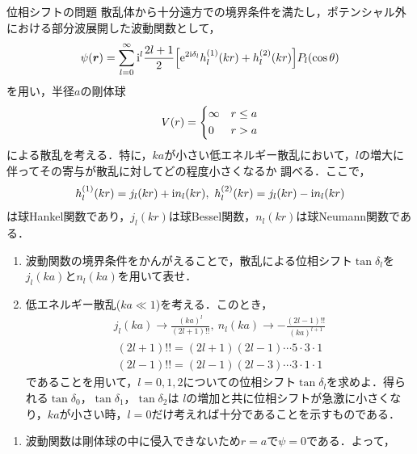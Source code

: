 \documentclass{report}
\begin{document}
  \begin{myex}{位相シフトの問題}{}
    散乱体から十分遠方での境界条件を満たし，ポテンシャル外における部分波展開した波動関数として，
    \begin{align}
      \psi(\bm{r}) = \sum_{l=0}^{\infty} \mathrm{i}^l \frac{2l+1}{2}\qty[\mathrm{e}^{2\mathrm{i}\delta_l} h_l^{(1)} (kr) + h_l^{(2)} (kr)] P_l(\cos\theta)
    \end{align}
    を用い，半径$a$の剛体球
    \begin{align}
      V(r) = 
      \begin{dcases}
        \infty & r\leq a \\
        0 & r > a 
      \end{dcases}
    \end{align}
    による散乱を考える．特に，$ka$が小さい低エネルギー散乱において，$l$の増大に伴ってその寄与が散乱に対してどの程度小さくなるか
    調べる．ここで，
    \begin{align}
      h_l^{(1)}(kr) = j_l(kr) + \mathrm{i} n_l(kr),\ h_l^{(2)}(kr) = j_l(kr) - \mathrm{i} n_l(kr)
    \end{align}
    は球Hankel関数であり，$j_l(kr)$は球Bessel関数，$n_l(kr)$は球Neumann関数である．
    \begin{enumerate}
      \item 波動関数の境界条件をかんがえることで，散乱による位相シフト$\tan\delta_l$を$j_l(ka)$と$n_l(ka)$を用いて表せ．
      \item 低エネルギー散乱($ka \ll 1$)を考える．このとき，
        \begin{align}
          j_l(ka) \to \frac{(ka)^l}{(2l+1)!!},\ n_l(ka) \to -\frac{(2l-1)!!}{(ka)^{l+1}}\label{LimitOfBessel}
        \end{align}
        \begin{align}
          (2l+1)!! = (2l+1)(2l-1)\cdots5\cdot3\cdot1 \\
          (2l-1)!! = (2l-1)(2l-3)\cdots3\cdot1\cdot1
        \end{align}
        であることを用いて，$l = 0, 1, 2$についての位相シフト$\tan\delta_l$を求めよ．得られる$\tan\delta_0$，$\tan\delta_1$，$\tan\delta_2$は
        $l$の増加と共に位相シフトが急激に小さくなり，$ka$が小さい時，$l = 0$だけ考えれば十分であることを示すものである．
    \end{enumerate}
    \tcblower
    \begin{enumerate}
      \item 波動関数は剛体球の中に侵入できないため$r=a$で$\psi=0$である．よって，
        \begin{align}

\end{align}
\end{enumerate}
\end{myex}
\end{document}
